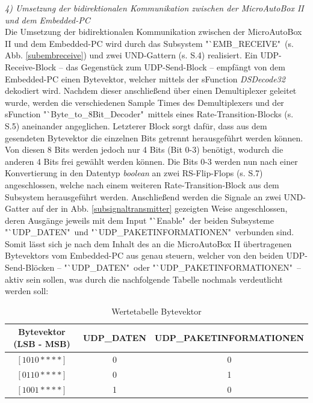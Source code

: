 \documentclass[fontsize = 12pt, paper = a4]{scrreprt}
\begin{document}

\textit{4) Umsetzung der bidirektionalen Kommunikation zwischen der MicroAutoBox II und dem Embedded-PC} \\

Die Umsetzung der bidirektionalen Kommunikation zwischen der MicroAutoBox II und dem Embedded-PC wird durch das Subsystem "`EMB\_RECEIVE"\ (s. Abb. \ref{subembreceive})  und zwei UND-Gattern (s. S.4) realisiert. Ein UDP-Receive-Block -- das Gegenstück zum UDP-Send-Block -- empfängt von dem Embedded-PC einen Bytevektor, welcher mittels der sFunction \textit{DSDecode32} dekodiert wird. Nachdem dieser anschließend über einen Demultiplexer geleitet wurde, werden die verschiedenen Sample Times des Demultiplexers und der sFunction "`Byte\_to\_8Bit\_Decoder"\ mittels eines Rate-Transition-Blocks (s. S.5) aneinander angeglichen. Letzterer Block sorgt dafür, dass aus dem gesendeten Bytevektor die einzelnen Bits getrennt herausgeführt werden können. Von diesen 8 Bits werden jedoch nur 4 Bits (Bit 0-3) benötigt, wodurch die anderen 4 Bits frei gewählt werden können. Die Bits 0-3 werden nun nach einer Konvertierung in den Datentyp \textit{boolean} an zwei RS-Flip-Flops (s. S.7) angeschlossen, welche nach einem weiteren Rate-Transition-Block aus dem Subsystem herausgeführt werden. Anschließend werden die Signale an zwei UND-Gatter auf der in Abb. \ref{subsignaltransmitter} gezeigten Weise angeschlossen, deren Ausgänge jeweils mit dem Input "`Enable"\ der beiden Subsysteme "`UDP\_DATEN"\ und "`UDP\_PAKETINFORMATIONEN"\ verbunden sind. Somit lässt sich je nach dem Inhalt des an die MicroAutoBox II übertragenen Bytevektors vom Embedded-PC aus genau steuern, welcher von den beiden UDP-Send-Blöcken -- "`UDP\_DATEN"\ oder "`UDP\_PAKETINFORMATIONEN"\ -- aktiv sein sollen, was durch die nachfolgende Tabelle nochmals verdeutlicht werden soll:

\begin{table}[h]
\centering

\caption{Wertetabelle Bytevektor}

 \begin{tabular}{ c | c | c }
 
 \toprule[1.5pt]
 Bytevektor (LSB - MSB) & UDP\_DATEN   &  UDP\_PAKETINFORMATIONEN  \\
 \midrule
  $[1 0 1 0 * * * *]$ & 0 & 0     \\
\midrule  
  $[0 1 1 0 * * * *]$ & 0 & 1     \\
\midrule  
  $[1 0 0 1 * * * *]$ & 1 & 0     \\

 
 \bottomrule[1.5pt] 
 
\end{tabular}

\end{table}
\end{document}
